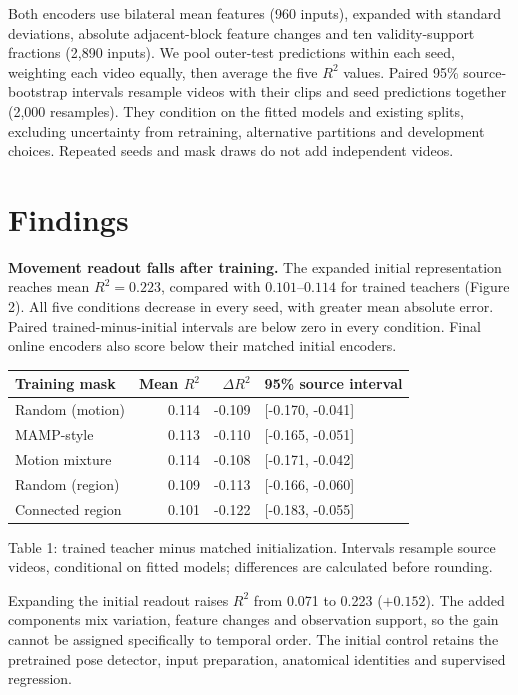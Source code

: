 \documentclass{article}
\begin{document}
Both encoders use bilateral mean features (960 inputs), expanded with
standard deviations, absolute adjacent-block feature changes and ten
validity-support fractions (2,890 inputs). We pool outer-test
predictions within each seed, weighting each video equally, then average
the five \(R^2\) values. Paired 95\% source-bootstrap intervals resample
videos with their clips and seed predictions together (2,000 resamples).
They condition on the fitted models and existing splits, excluding
uncertainty from retraining, alternative partitions and development
choices. Repeated seeds and mask draws do not add independent videos.

\section{Findings}\label{findings}

\textbf{Movement readout falls after training.} The expanded initial
representation reaches mean \(R^2=0.223\), compared with
\(0.101\)--\(0.114\) for trained teachers (Figure 2). All five
conditions decrease in every seed, with greater mean absolute error.
Paired trained-minus-initial intervals are below zero in every
condition. Final online encoders also score below their matched initial
encoders.

\begin{center}
\begin{tabular}{lrrl}
\toprule
Training mask & Mean $R^2$ & $\Delta R^2$ & 95\% source interval \\
\midrule
Random (motion) & 0.114 & -0.109 & [-0.170, -0.041] \\
MAMP-style & 0.113 & -0.110 & [-0.165, -0.051] \\
Motion mixture & 0.114 & -0.108 & [-0.171, -0.042] \\
Random (region) & 0.109 & -0.113 & [-0.166, -0.060] \\
Connected region & 0.101 & -0.122 & [-0.183, -0.055] \\
\bottomrule
\end{tabular}
\end{center}

Table 1: trained teacher minus matched initialization. Intervals
resample source videos, conditional on fitted models; differences are
calculated before rounding.

Expanding the initial readout raises \(R^2\) from 0.071 to 0.223
(\(+0.152\)). The added components mix variation, feature changes and
observation support, so the gain cannot be assigned specifically to
temporal order. The initial control retains the pretrained pose
detector, input preparation, anatomical identities and supervised
regression.
\end{document}
